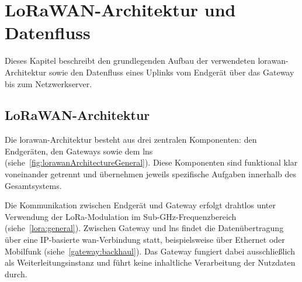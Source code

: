 %
%

\chapter{LoRaWAN-Architektur und Datenfluss}
	Dieses Kapitel beschreibt den grundlegenden Aufbau der verwendeten \acs{lorawan}-Architektur sowie den Datenfluss eines Uplinks vom Endgerät über das Gateway bis zum Netzwerkserver.

\section{LoRaWAN-Architektur}
	Die \acs{lorawan}-Architektur besteht aus drei zentralen Komponenten: den Endgeräten, den Gateways sowie dem \acl{lns} (siehe~\autoref{fig:lorawanArchitectureGeneral}). Diese Komponenten sind funktional klar voneinander getrennt und übernehmen jeweils spezifische Aufgaben innerhalb des Gesamtsystems.

	\begin{figure}[H]
		\centering
		\label{fig:lorawanArchitectureGeneral}
	\end{figure}
	
	Die Kommunikation zwischen Endgerät und Gateway erfolgt drahtlos unter Verwendung der LoRa-Modulation im Sub-GHz-Frequenzbereich (siehe~\autoref{lora:general}). Zwischen Gateway und \acs{lns} findet die Datenübertragung über eine IP-basierte \acs{wan}-Verbindung statt, beispielsweise über Ethernet oder Mobilfunk (siehe~\autoref{gateway:backhaul}). Das Gateway fungiert dabei ausschlie{\ss}lich als Weiterleitungsinstanz und führt keine inhaltliche Verarbeitung der Nutzdaten durch.

